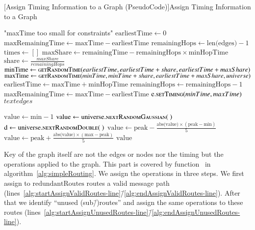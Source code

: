 \begin{breakablealgorithm}
	[Assign Timing Information to a Graph (PseudoCode)]{Assign Timing Information to a Graph}\label{alg:simpleTiming}
	\begin{algorithmic}[1]
		\label{alg:assignTiming-line}
		\Throw "maxTime too small for constraints"
		\EndIf
		\State $\text{earliestTime} \gets 0$
		\State $\text{maxRemainingTime} \gets \text{maxTime}-\text{earliestTime}$
		\State $\text{remainingHops} \gets \text{len(edges)} - 1$
		\State $\text{times} \gets []$
		\State $\text{maxShare} \gets \text{remainingTime} - \text{remainingHops}\times\text{minHopTime}$
		\State $\text{share} \gets \frac{maxShare}{remainingHops}$
		\State $\text{minTime} \gets \Call{getRandomTime}{earliestTime, earliestTime+share, earliestTime+maxShare}$\label{alg:minTime-line}
		\State $\text{maxTime} \gets \Call{getRandomTime}{minTime, minTime+share, earliestTime+maxShare, universe}$\label{alg:maxTime-line}
		\State $\text{earliestTime} \gets \text{maxTime}+\text{minHopTime}$
		\State $\text{remainingHops} \gets \text{remainingHops} - 1$
		\State $\text{maxRemainingTime} \gets \text{maxTime}-\text{earliestTime}$
		\State $\text{e}.\Call{setTiming}{minTime, maxTime}$
		\EndFor
		\Return $text{edges}$
		\EndFunction
		\item[]		
		\label{alg:getRandomTime-line}
		\State $\text{value} \gets \text{min}-1$
		\State $\text{value} \gets \text{universe}.\Call{nextRandomGaussian}{~}$
		\State $\text{d} \gets \text{universe}.\Call{nextRandomDouble}{~}$
		\State $\text{value} \gets \text{peak} - \frac{\text{abs(value)} \times (\text{peak} - \text{min})}{5}$
		\Else
		\State $\text{value} \gets \text{peak} + \frac{\text{abs(value)} \times (\text{max} - \text{peak})}{5}$
		\EndIf
		\EndWhile
		\Return $\text{value}$
		\EndFunction
	\end{algorithmic}
\end{breakablealgorithm}

Key of the graph itself are not the edges or nodes nor the timing but the operations applied to the graph. This part is covered by function~ in algorithm~\ref{alg:simpleRouting}. We assign the operations in three steps. We first assign to $\text{redundantRoutes}$ routes a valid message path (lines~\ref{alg:startAssignValidRoutes-line}\=/\ref{alg:endAssignValidRoutes-line}). After that we identify ``unused (sub\=/)routes'' and assign the same operations to these routes (lines~\ref{alg:startAssignUnusedRoutes-line}\=/\ref{alg:endAssignUnusedRoutes-line}). 

